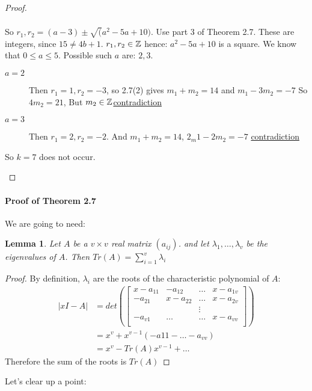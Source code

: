 \documentclass[]{article}
\newtheorem{lem}[thm]{Lemma}
\theoremstyle{definition}
\theoremstyle{remark}
\numberwithin{equation}{section}
\begin{document}
\begin{proof}
\begin{description}
\begin{align*}
							\end{align*}
							So $r_1,r_2 =  (a-3)\pm \sqrt(a^2 - 5a + 10)$. Use part 3 of Theorem 2.7. These are integers, since $15 \neq 4b + 1$.
							$r_1, r_2 \in \mathbb{Z}$ hence: $a^2 -5a + 10$ is a square. We know that $0 \leq a \leq 5$. Possible such $a$ are: $2, 3$. 
							\begin{description}
								\item[$a= 2$] Then $r_1 = 1, r_2 = -3$, so 2.7(2) gives $m_1 + m_2 = 14$ and $m_1 - 3m_2 = -7$
								So $4m_2 = 21$, But $m_2 \in \mathbb{Z}$\underline{contradiction}
								\item[$a = 3$] Then $r_1 = 2, r_2 = -2$. And $m_1 + m_2 = 14$, $2_m1 - 2m_2 = -7$ \underline{contradiction}
							\end{description}
							So $k = 7$ does not occur.
					\end{description}
				\end{proof}
				\paragraph{Proof of Theorem 2.7}
				We are going to need:
				\begin{lem} Let $A$ be a $v \times v$ real matrix $(a_{ij})$. and let $\lambda_1, \hdots, \lambda_v$ be the eigenvalues of $A$. Then $Tr(A) = \sum_{i=1}^{v} \lambda_i$
				\end{lem}
				\begin{proof}
					By definition, $\lambda_i$ are the roots of the characteristic polynomial of $A$:
					\begin{align*}
						|xI - A| &= det\left(\begin{bmatrix}
									x - a_{11}& -a_{12} &\hdots& x- a_{1v}\\
									-a_{21}& x-a_{22} &\hdots& x- a_{2v}\\
									& &\vdots &\\
									-a_{v1} & \hdots & \hdots & x-a_{vv}\\
								   \end{bmatrix}\right)\\
								 &= x^v + x^{v-1}(-a{11} - \hdots - a_{vv})\\
								 &= x^v - Tr(A) x^{v-1} + \hdots
					\end{align*}
					Therefore the sum of the roots is $Tr(A)$
				\end{proof}


		Let's clear up a point:
\end{document}
